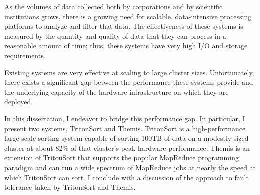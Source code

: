 \begin{dissertationabstract}
As the volumes of data collected both by corporations and by
scientific institutions grows, there is a growing need for scalable,
data-intensive processing platforms to analyze and filter that data. The
effectiveness of these systems is measured by the quantity and quality of data
that they can process in a reasonable amount of time; thus, these systems have
very high I/O and storage requirements.

Existing systems are very effective at scaling to large cluster
sizes. Unfortunately, there exists a significant gap between the performance
these systems provide and the underlying capacity of the hardware
infrastructure on which they are deployed.

In this dissertation, I endeavor to bridge this performance gap. In particular,
I present two systems, TritonSort and Themis. TritonSort is a high-performance
large-scale sorting system capable of sorting 100TB of data on a modestly-sized
cluster at about 82\% of that cluster's peak hardware performance. Themis is an
extension of TritonSort that supports the popular MapReduce programming
paradigm and can run a wide spectrum of MapReduce jobs at nearly the speed at
which TritonSort can sort. I conclude with a discussion of the approach to
fault tolerance taken by TritonSort and Themis.

\end{dissertationabstract}
